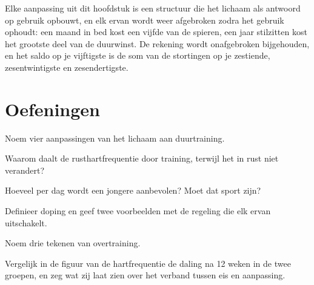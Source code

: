 \begin{remark}\label{rem:g10:sport-and-health:account}
Elke aanpassing uit dit hoofdstuk is een structuur die het lichaam als
antwoord op gebruik opbouwt, en elk ervan wordt weer afgebroken zodra het
gebruik ophoudt: een maand in bed kost een vijfde van de spieren, een
jaar stilzitten kost het grootste deel van de duurwinst. De rekening
wordt onafgebroken bijgehouden, en het saldo op je vijftigste is de som
van de stortingen op je zestiende, zesentwintigste en zesendertigste.
\end{remark}

\section{Oefeningen}

\begin{exercise}[$\star$]\label{exo:g10:sport-and-health:1}
Noem vier aanpassingen van het lichaam aan duurtraining.
\end{exercise}

\begin{exercise}[$\star$]\label{exo:g10:sport-and-health:2}
Waarom daalt de rusthartfrequentie door training, terwijl het
 in rust niet verandert?
\end{exercise}

\begin{exercise}[$\star$]\label{exo:g10:sport-and-health:3}
Hoeveel  per dag wordt een jongere aanbevolen? Moet dat
sport zijn?
\end{exercise}

\begin{exercise}[$\star$]\label{exo:g10:sport-and-health:4}
Definieer doping en geef twee voorbeelden met de regeling die elk ervan
uitschakelt.
\end{exercise}

\begin{exercise}[$\star$]\label{exo:g10:sport-and-health:5}
Noem drie tekenen van overtraining.
\end{exercise}

\begin{exercise}[$\star\star$]\label{exo:g10:sport-and-health:6}
Vergelijk in de figuur van de hartfrequentie de daling na 12 weken in de
twee groepen, en zeg wat zij laat zien over het verband tussen eis en
aanpassing.
\end{exercise}

